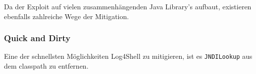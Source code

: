 
Da der \mysubtitle  Exploit auf vielen zusammenhängenden Java Library's aufbaut, existieren ebenfalls zahlreiche Wege der Mitigation.

\subsubsection{Quick and Dirty}
Eine der schnellsten Möglichkeiten Log4Shell zu mitigieren, ist es \verb|JNDILookup| aus dem classpath zu entfernen.
